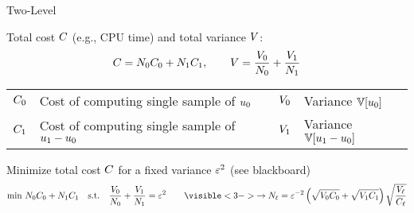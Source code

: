 \begin{frame}{Two-Level \name{}}
    \begin{squarelist}
        \item<1-> Total cost $C$ (e.g., CPU time) and total variance $V$:
        \begin{equation*}
            C = N_0C_0 + N_1C_1, \qquad V = \frac{V_0}{N_0} + \frac{V_1}{N_1}
        \end{equation*}
        \vspace{-1.5em}
        \begin{block}{}
            \begin{centering}
                \begin{tabular}{r|lcr|l}
                    $C_0$ & Cost of computing single sample of $u_0$ & &
                    $V_0$ & Variance $\mathbb{V}[u_0]$ \\
                    $C_1$ & Cost of computing single sample of $u_1-u_0$ & &
                    $V_1$ & Variance $\mathbb{V}[u_1 - u_0]$ 
                \end{tabular}
            \end{centering}
        \end{block}
        \vspace{0.5em}
        \item<2-> Minimize total cost $C$ for a fixed variance $\varepsilon^2$ (see blackboard)
            \begin{equation*}
                \min\, \nsamp_0\cost_0 + \nsamp_1\cost_1 \quad \text{s.t.} \quad \frac{\vara_0}{\nsamp_0} + \frac{\vara_1}{\nsamp_1} = \tol^2 \qquad \visible<3->{\rightarrow \nsamp_\ell = \tol^{-2}\left(\sqrt{\vara_0 \cost_0} + \sqrt{\vara_1 \cost_1}\right)\sqrt{\frac{\vara_\ell}{\cost_\ell}}}
            \end{equation*}
    \end{squarelist}
\end{frame}

